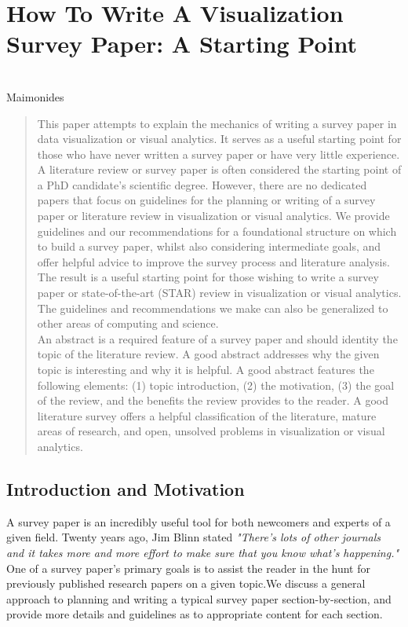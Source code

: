 \chapter{How To Write A Visualization Survey Paper: A Starting Point}
\label{chap:howTo}
 \cite{mcnabb2019how} \\
{Maimonides}

\begin{abstract}
This paper attempts to explain the mechanics of writing a survey paper in data visualization or visual analytics. It serves as a useful starting point for those who have never written a survey paper or have very little experience. A literature review or survey paper is often considered the starting point of a PhD candidate's scientific degree. However, there are no dedicated papers that focus on guidelines for the planning or writing of a survey paper or literature review in visualization or visual analytics. We provide guidelines and our recommendations for a foundational structure on which to build a survey paper, whilst also considering intermediate goals, and offer helpful advice to improve the  survey process and literature analysis. The result is a useful starting point for those wishing to write a survey paper or state-of-the-art (STAR) review in visualization or visual analytics. The guidelines and recommendations we make can also be generalized to other areas of computing and science.\\

An abstract is a required feature of a survey paper and should identity the topic of the literature review. A good abstract addresses why the given topic is interesting and why it is helpful. A good abstract features the following elements:  (1) topic introduction, (2) the motivation, (3) the goal of the review, and the benefits the review provides to the reader. A good literature survey offers a helpful classification of the literature, mature areas of research, and open, unsolved  problems in visualization or visual analytics.
\end{abstract}  \newpage
\section{Introduction and Motivation} \label{sec:introduction}
A survey paper is an incredibly useful tool for both newcomers and experts of a given field. Twenty years ago, Jim Blinn stated \emph{"There's lots of other journals and it takes more and more effort to make sure that you know what's happening."} \cite{blinn1998ten} One of a survey paper's primary goals is to assist the reader in the hunt for  previously published research papers on a given topic.We discuss a general approach to planning and writing a typical survey paper section-by-section, and provide  more details and guidelines as to appropriate content for each section. 

